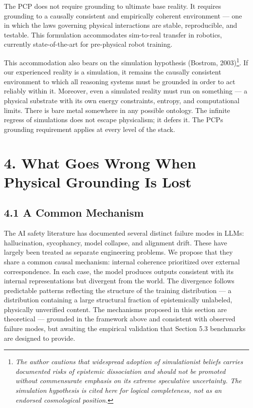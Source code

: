 \documentclass[
]{article}
\begin{document}
The PCP does not require grounding to ultimate base reality. It requires
grounding to a causally consistent and empirically coherent environment
--- one in which the laws governing physical interactions are stable,
reproducible, and testable. This formulation accommodates sim-to-real
transfer in robotics, currently state-of-the-art for pre-physical robot
training.

This accommodation also bears on the simulation hypothesis (Bostrom,
2003)\footnote{\emph{The author cautions that widespread adoption of
  simulationist beliefs carries documented risks of epistemic
  dissociation and should not be promoted without commensurate emphasis
  on its extreme speculative uncertainty. The simulation hypothesis is
  cited here for logical completeness, not as an endorsed cosmological
  position.}}. If our experienced reality is a simulation, it remains
the causally consistent environment to which all reasoning systems must
be grounded in order to act reliably within it. Moreover, even a
simulated reality must run on something --- a physical substrate with
its own energy constraints, entropy, and computational limits. There is
bare metal somewhere in any possible ontology. The infinite regress of
simulations does not escape physicalism; it defers it. The
PCP\textquotesingle s grounding requirement applies at every level of
the stack.

\section{\texorpdfstring{\textbf{4. What Goes Wrong When Physical
Grounding Is
Lost}}{4. What Goes Wrong When Physical Grounding Is Lost}}\label{what-goes-wrong-when-physical-grounding-is-lost}

\subsection{4.1 A Common Mechanism}\label{a-common-mechanism}

The AI safety literature has documented several distinct failure modes
in LLMs: hallucination, sycophancy, model collapse, and alignment drift.
These have largely been treated as separate engineering problems. We
propose that they share a common causal mechanism: internal coherence
prioritized over external correspondence. In each case, the model
produces outputs consistent with its internal representations but
divergent from the world. The divergence follows predictable patterns
reflecting the structure of the training distribution --- a distribution
containing a large structural fraction of epistemically unlabeled,
physically unverified content. The mechanisms proposed in this section
are theoretical --- grounded in the framework above and consistent with
observed failure modes, but awaiting the empirical validation that
Section 5.3 benchmarks are designed to provide.
\end{document}
